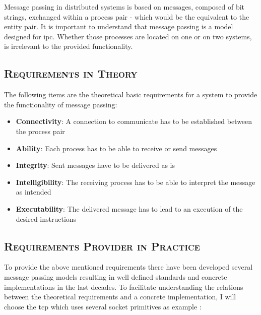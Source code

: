 \documentclass[xcolor=dvipsnames]{article}
\begin{document}
\noindent Message passing in distributed systems is based on messages, composed of bit strings, exchanged within a process pair - which would be the equivalent to the entity pair. It is important to understand that message passing is a model designed for \gls{ipc}. Whether those processes are located on one or on two systems, is irrelevant to the provided functionality.\\

\subsection{\scshape{Requirements in Theory}}

\noindent The following items are the theoretical basic requirements for a system to provide the functionality of message passing:

\begin{itemize}

\item \textbf{Connectivity}: A connection to communicate has to be established between the process pair
\item \textbf{Ability}: Each process has to be able to receive or send messages
\item \textbf{Integrity}: Sent messages have to be delivered as is
\item \textbf{Intelligibility}: The receiving process has to be able to interpret the message as intended
\item \textbf{Executability}: The delivered message has to lead to an execution of the desired instructions

\end{itemize}

\subsection{\scshape{Requirements Provider in Practice}}

\noindent To provide the above mentioned requirements there have been developed several message passing models resulting in well defined standards and concrete implementations in the last decades. To facilitate understanding the relations between the theoretical requirements and a concrete implementation, I will choose the \gls{tcp} which uses several socket primitives as example \cite[chap 4.3.1 on p. 141 - 142]{tanenbaum}:
\end{document}
